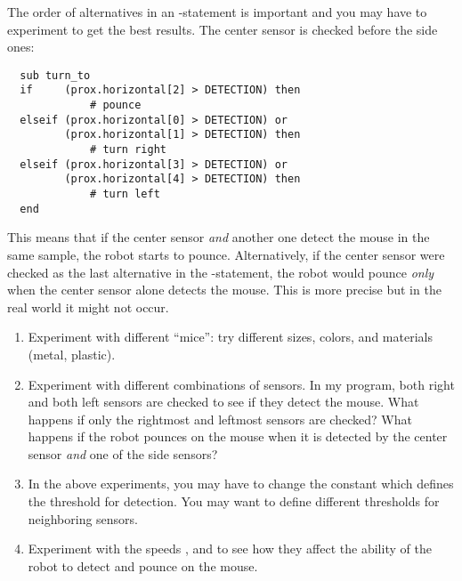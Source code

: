 The order of alternatives in an -statement is important and you
may have to experiment to get the best results. The center sensor is
checked before the side ones:

\begin{verbatim}
  sub turn_to
  if     (prox.horizontal[2] > DETECTION) then
             # pounce
  elseif (prox.horizontal[0] > DETECTION) or
         (prox.horizontal[1] > DETECTION) then
             # turn right
  elseif (prox.horizontal[3] > DETECTION) or
         (prox.horizontal[4] > DETECTION) then
             # turn left
  end
\end{verbatim}
This means that if the center sensor \emph{and} another one detect the
mouse in the same sample, the robot starts to pounce. Alternatively,
if the center sensor were checked as the last alternative in the
-statement, the robot would pounce \emph{only} when the center
sensor alone detects the mouse. This is more precise but in the real
world it might not occur.



\begin{enumerate}

\item Experiment with different ``mice'': try different sizes,
colors, and materials (metal, plastic).

\item Experiment with different combinations of sensors. In my program,
both right and both left sensors are checked to see if they detect the
mouse. What happens if only the rightmost and leftmost sensors are
checked? What happens if the robot pounces on the mouse when it is
detected by the center sensor \emph{and} one of the side sensors?

\item In the above experiments, you may have to change the constant
 which defines the threshold for detection. You may want to
define different thresholds for neighboring sensors.

\item Experiment with the speeds ,  and  to
see how they affect the ability of the robot to detect and pounce on the
mouse.

\end{enumerate}